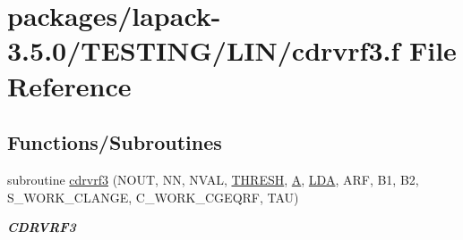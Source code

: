 \hypertarget{cdrvrf3_8f}{}\section{packages/lapack-\/3.5.0/\+T\+E\+S\+T\+I\+N\+G/\+L\+I\+N/cdrvrf3.f File Reference}
\label{cdrvrf3_8f}
\subsection*{Functions/\+Subroutines}
\begin{DoxyCompactItemize}
\item 
subroutine \hyperlink{group__complex__lin_gae8155b9d7d1288944772d51748157da1}{cdrvrf3} (N\+O\+U\+T, N\+N, N\+V\+A\+L, \hyperlink{zlaqgs_8c_a0656018abfc9fa2821827415f5d5ea57}{T\+H\+R\+E\+S\+H}, \hyperlink{classA}{A}, \hyperlink{example__user_8c_ae946da542ce0db94dced19b2ecefd1aa}{L\+D\+A}, A\+R\+F, B1, B2, S\+\_\+\+W\+O\+R\+K\+\_\+\+C\+L\+A\+N\+G\+E, C\+\_\+\+W\+O\+R\+K\+\_\+\+C\+G\+E\+Q\+R\+F, T\+A\+U)
\begin{DoxyCompactList}\small\item\em {\bfseries C\+D\+R\+V\+R\+F3} \end{DoxyCompactList}\end{DoxyCompactItemize}

